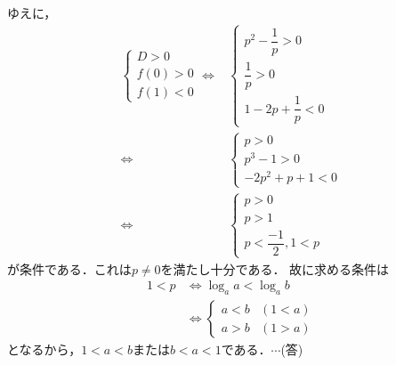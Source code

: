 \documentclass[../../main.tex]{subfiles}
\begin{document}
ゆえに，
\begin{align}
  \begin{cases}
    D>0  \\
    f(0)>0  \\
    f(1)<0
  \end{cases}
  \Longleftrightarrow
  &
  \begin{cases}
    p^2-\dfrac{1}{p}>0  \\
    \dfrac{1}{p}>0  \\
    1-2p+\dfrac{1}{p}<0
  \end{cases} \\
  \Longleftrightarrow
  &
  \begin{cases}
    p>0  \\
    p^3-1>0  \\
    -2p^2+p+1<0
  \end{cases} \\
  \Longleftrightarrow
  &
  \begin{cases}
    p>0  \\
    p>1  \\
    p<\dfrac{-1}{2},1<p
  \end{cases}
\end{align}
が条件である．これは$p\not=0$を満たし十分である．
故に求める条件は
\begin{align}
  1<p
  &\Longleftrightarrow
  \log_aa<\log_ab  \\
  &\Longleftrightarrow
  \begin{cases}
    a<b & (1<a)  \\
    a>b & (1>a)
  \end{cases}
\end{align}
となるから，$1<a<b$または$b<a<1$である．$\cdots$(答)
\newpage
\end{document}
